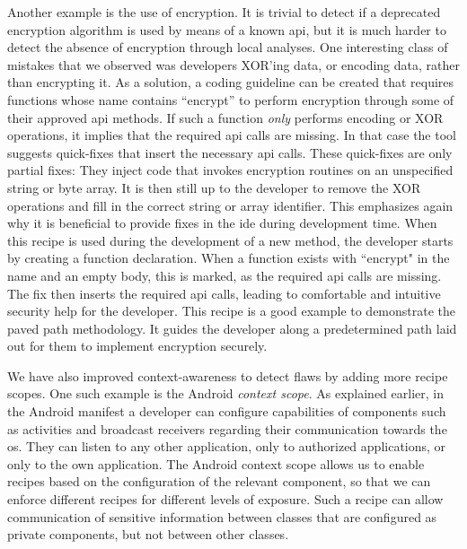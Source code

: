 Another example is the use of encryption.
It is trivial to detect if a deprecated encryption algorithm is used by means of a known \gls{api}, but it is much harder to detect the absence of encryption through local analyses.
One interesting class of mistakes that we observed was developers XOR’ing data, or encoding data, rather than encrypting it.
As a solution, a coding guideline can be created that requires functions whose name contains “encrypt” to perform encryption through some of their approved \gls{api} methods.
If such a function \emph{only} performs encoding or XOR operations, it implies that the required \gls{api} calls are missing.
In that case the tool suggests quick-fixes that insert the necessary \gls{api} calls.
These quick-fixes are only partial fixes: They inject code that invokes encryption routines on an unspecified string or byte array.
It is then still up to the developer to remove the XOR operations and fill in the correct string or array identifier.
This emphasizes again why it is beneficial to provide fixes in the \gls{ide} during development time.
When this recipe is used during the development of a new method, the developer starts by creating a function declaration.
When a function exists with ``encrypt" in the name and an empty body, this is marked, as the required \gls{api} calls are missing.
The fix then inserts the required \gls{api} calls, leading to comfortable and intuitive security help for the developer.
This recipe is a good example to demonstrate the paved path methodology.
It guides the developer along a predetermined path laid out for them to implement encryption securely.

We have also improved context-awareness to detect flaws by adding more recipe scopes.
One such example is the Android \emph{context scope}.
As explained earlier, in the Android manifest a developer can configure capabilities of components such as activities and broadcast receivers regarding their communication towards the \gls{os}.
They can listen to any other application, only to authorized applications, or only to the own application.
The Android context scope allows us to enable recipes based on the configuration of the relevant component, so that we can enforce different recipes for different levels of exposure.
Such a recipe can allow communication of sensitive information between classes that are configured as private components, but not between other classes.

